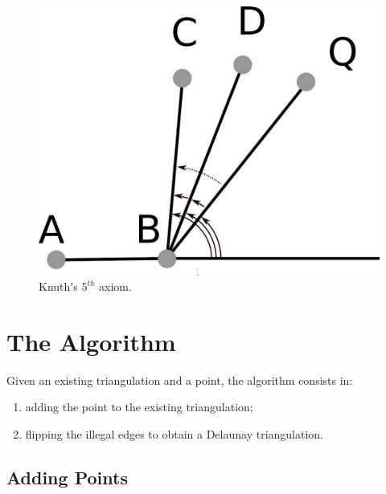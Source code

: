 \documentclass[18pt]{beamer}
\begin{document}
\begin{frame}
\begin{overprint}
\begin{figure}
  \centering
  \includegraphics[scale=1.4 ]{Axiom5}
  \caption{Knuth's $5^{th}$ axiom.}
\end{figure}
\end{overprint}

\end{frame}


\section{The Algorithm}

\begin{frame}
Given an existing triangulation and a point, the algorithm consists in:
\begin{enumerate}
\item<1-> adding the point to the existing triangulation;
\item<2-> flipping the illegal edges to obtain a Delaunay triangulation.
\end{enumerate}
\end{frame}


\subsection{Adding Points}
\end{document}
